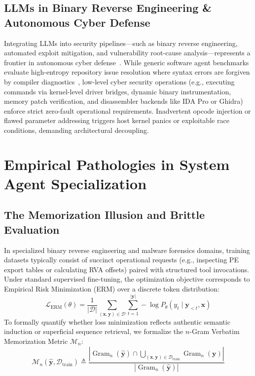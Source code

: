 \documentclass{article}
\begin{document}
\subsection{LLMs in Binary Reverse Engineering \& Autonomous Cyber Defense}
Integrating LLMs into security pipelines---such as binary reverse engineering, automated exploit mitigation, and vulnerability root-cause analysis---represents a frontier in autonomous cyber defense~\cite{patil2023gorilla,qin2024toolllm}. While generic software agent benchmarks evaluate high-entropy repository issue resolution where syntax errors are forgiven by compiler diagnostics~\cite{jimenez2024swebench}, low-level cyber security operations (e.g., executing commands via kernel-level driver bridges, dynamic binary instrumentation, memory patch verification, and disassembler backends like IDA Pro or Ghidra) enforce strict zero-fault operational requirements. Inadvertent opcode injection or flawed parameter addressing triggers host kernel panics or exploitable race conditions, demanding architectural decoupling.

\section{Empirical Pathologies in System Agent Specialization}

\subsection{The Memorization Illusion and Brittle Evaluation}

In specialized binary reverse engineering and malware forensics domains, training datasets typically consist of succinct operational requests (e.g., inspecting PE export tables or calculating RVA offsets) paired with structured tool invocations. Under standard supervised fine-tuning, the optimization objective corresponds to Empirical Risk Minimization (ERM) over a discrete token distribution:
\begin{equation}
\label{eq:erm_loss}
\mathcal{L}_{\text{ERM}}(\theta) = \frac{1}{|\mathcal{D}|} \sum_{(\mathbf{x}, \mathbf{y}) \in \mathcal{D}} \sum_{t=1}^{|\mathbf{y}|} -\log P_\theta(y_t \mid \mathbf{y}_{<t}, \mathbf{x})
\end{equation}
To formally quantify whether loss minimization reflects authentic semantic induction or superficial sequence retrieval, we formalize the $n$-Gram Verbatim Memorization Metric $\mathcal{M}_n$:
\begin{equation}
\label{eq:memorization_metric}
\mathcal{M}_n(\hat{\mathbf{y}}, \mathcal{D}_{\text{train}}) \triangleq \frac{\left| \operatorname{Gram}_n(\hat{\mathbf{y}}) \cap \bigcup_{(\mathbf{x},\mathbf{y}) \in \mathcal{D}_{\text{train}}} \operatorname{Gram}_n(\mathbf{y}) \right|}{\left| \operatorname{Gram}_n(\hat{\mathbf{y}}) \right|}
\end{equation}
\end{document}
